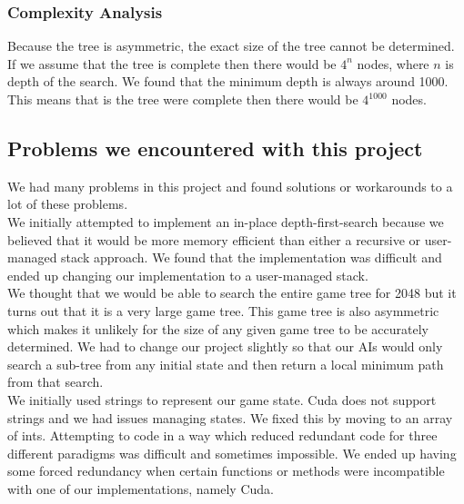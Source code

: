 \documentclass[a4paper]{article}
\begin{document}
\subsubsection{Complexity Analysis}
Because the tree is asymmetric, the exact size of the tree cannot be determined. If we assume that the tree is complete then there would be $4^n$ nodes, where $n$ is depth of the search. We found that the minimum depth is always around 1000. This means that is the tree were complete then there would be $4^1000$ nodes. 

\subsection{Problems we encountered with this project}
We had many problems in this project and found solutions or workarounds to a lot of these problems.\\

\noindent We initially attempted to implement an in-place depth-first-search because we believed that it would be more memory efficient than either a recursive or user-managed stack approach. We found that the implementation was difficult and ended up changing our implementation to a user-managed stack.\\

\noindent We thought that we would be able to search the entire game tree for 2048 but it turns out that it is a very large game tree. This game tree is also asymmetric which makes it unlikely for the size of any given game tree to be accurately determined. We had to change our project slightly so that our AIs would only search a sub-tree from any initial state and then return a local minimum path from that search.\\

\noindent We initially used strings to represent our game state. Cuda does not support strings and we had issues managing states. We fixed this by moving to an array of ints.
Attempting to code in a way which reduced redundant code for three different paradigms was difficult and sometimes impossible. We ended up having some forced redundancy when certain functions or methods were incompatible with one of our implementations, namely Cuda.\\
\end{document}
